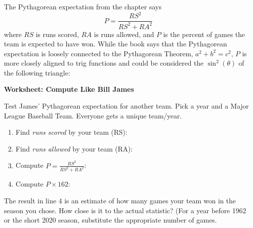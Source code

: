 
The Pythagorean expectation from the chapter says 
\[ P = \frac{RS^2}{RS^2+RA^2}\]
where $RS$ is runs scored, \(RA\) is runs allowed, and \(P\) is the percent of games the team is expected to have won. While the book says that the Pythagorean expectation is loosely connected to the Pythagorean Theorem, \(a^2+b^2=c^2\), \(P\) is more closely aligned to trig functions and could be considered the \(\sin^2(\theta)\) of the following triangle:

\begin{center}
\end{center}

\textbf{Worksheet: Compute Like Bill James}

\noindent Test James' Pythagorean expectation for another team. Pick a year and a Major League Baseball Team. Everyone gets a unique team/year.

\begin{enumerate}
	\item Find \emph{runs scored} by your team (RS): \underline{\hspace{2cm}}
	\item Find \emph{runs allowed} by your team (RA): \underline{\hspace{2cm}}
	\item Compute \( P = \frac{RS^2}{RS^2+RA^2}\): \underline{\hspace{2cm}}
	\item Compute \(P\times 162\): \underline{\hspace{2cm}}
\end{enumerate}
The result in line 4 is an estimate of how many games your team won in the season you chose. How close is it to the actual statistic? (For a year before 1962 or the short 2020 season, substitute the appropriate number of games.
\vfill
\clearpage

